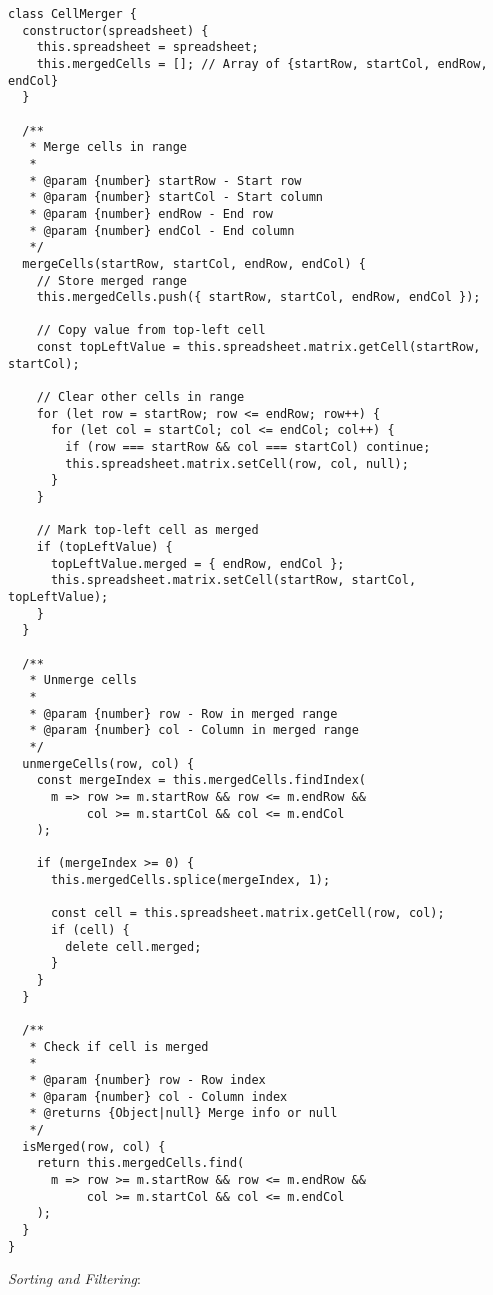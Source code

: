 \documentclass[11pt]{article}
\begin{document}
\begin{verbatim}
class CellMerger {
  constructor(spreadsheet) {
    this.spreadsheet = spreadsheet;
    this.mergedCells = []; // Array of {startRow, startCol, endRow, endCol}
  }
  
  /**
   * Merge cells in range
   * 
   * @param {number} startRow - Start row
   * @param {number} startCol - Start column
   * @param {number} endRow - End row
   * @param {number} endCol - End column
   */
  mergeCells(startRow, startCol, endRow, endCol) {
    // Store merged range
    this.mergedCells.push({ startRow, startCol, endRow, endCol });
    
    // Copy value from top-left cell
    const topLeftValue = this.spreadsheet.matrix.getCell(startRow, startCol);
    
    // Clear other cells in range
    for (let row = startRow; row <= endRow; row++) {
      for (let col = startCol; col <= endCol; col++) {
        if (row === startRow && col === startCol) continue;
        this.spreadsheet.matrix.setCell(row, col, null);
      }
    }
    
    // Mark top-left cell as merged
    if (topLeftValue) {
      topLeftValue.merged = { endRow, endCol };
      this.spreadsheet.matrix.setCell(startRow, startCol, topLeftValue);
    }
  }
  
  /**
   * Unmerge cells
   * 
   * @param {number} row - Row in merged range
   * @param {number} col - Column in merged range
   */
  unmergeCells(row, col) {
    const mergeIndex = this.mergedCells.findIndex(
      m => row >= m.startRow && row <= m.endRow &&
           col >= m.startCol && col <= m.endCol
    );
    
    if (mergeIndex >= 0) {
      this.mergedCells.splice(mergeIndex, 1);
      
      const cell = this.spreadsheet.matrix.getCell(row, col);
      if (cell) {
        delete cell.merged;
      }
    }
  }
  
  /**
   * Check if cell is merged
   * 
   * @param {number} row - Row index
   * @param {number} col - Column index
   * @returns {Object|null} Merge info or null
   */
  isMerged(row, col) {
    return this.mergedCells.find(
      m => row >= m.startRow && row <= m.endRow &&
           col >= m.startCol && col <= m.endCol
    );
  }
}
\end{verbatim}

\emph{Sorting and Filtering}:
\end{document}
